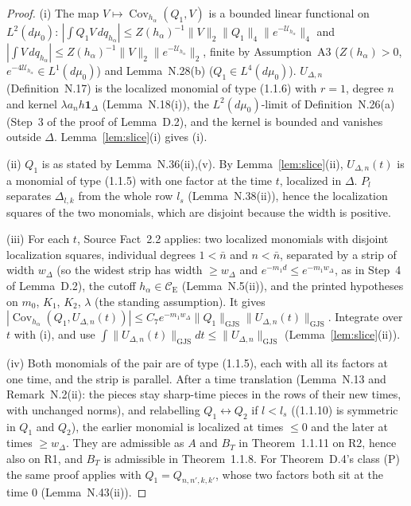 \documentclass[11pt,a4paper]{article}
\newcommand{\CE}{\mathcal{C}_{\mathrm E}}
\DeclareMathOperator{\Cov}{Cov}
\newcommand{\GJS}[1]{\lVert #1\rVert_{\mathrm{GJS}}}
\newcommand{\Uc}{\mathcal U}
\newcommand{\dmu}{d\mu_0}
\theoremstyle{plain}
\theoremstyle{definition}
\begin{document}
\begin{proof}
(i) The map $V\mapsto\Cov_{h_\alpha}(Q_1,V)$ is a bounded linear functional on $L^2(\dmu)$:
$|\int Q_1V\,dq_{h_\alpha}|\le Z(h_\alpha)^{-1}\|V\|_2\|Q_1\|_4\|e^{-\Uc_{h_\alpha}}\|_4$ and
$|\int V\,dq_{h_\alpha}|\le Z(h_\alpha)^{-1}\|V\|_2\|e^{-\Uc_{h_\alpha}}\|_2$, finite by
Assumption~A3 ($Z(h_\alpha)>0$, $e^{-4\Uc_{h_\alpha}}\in L^1(\dmu)$) and Lemma~N.28(b)
($Q_1\in L^4(\dmu)$).  $U_{\Delta,n}$ (Definition~N.17) is the localized monomial of type (1.1.6)
with $r=1$, degree $n$ and kernel $\lambda a_nh\mathbf 1_\Delta$ (Lemma~N.18(i)), the
$L^2(\dmu)$-limit of Definition~N.26(a) (Step~3 of the proof of Lemma~D.2), and the kernel is
bounded and vanishes outside $\Delta$.  Lemma~\ref{lem:slice}(i) gives (i).

(ii) $Q_1$ is as stated by Lemma~N.36(ii),(v).  By Lemma~\ref{lem:slice}(ii), $U_{\Delta,n}(t)$ is
a monomial of type (1.1.5) with one factor at the time $t$, localized in $\Delta$.  $P_l$
separates $\Delta_{l,k}$ from the whole row $l_s$ (Lemma~N.38(ii)), hence the localization
squares of the two monomials, which are disjoint because the width is positive.

(iii) For each $t$, Source Fact~2.2 applies: two localized monomials with disjoint localization
squares, individual degrees $1<\bar n$ and $n<\bar n$, separated by a strip of width $w_\Delta$
(so the widest strip has width $\ge w_\Delta$ and $e^{-m_1d}\le e^{-m_1w_\Delta}$, as in Step~4 of
Lemma~D.2), the cutoff $h_\alpha\in\CE$ (Lemma~N.5(ii)), and the printed hypotheses on $m_0$,
$K_1$, $K_2$, $\lambda$ (the standing assumption).  It gives
$|\Cov_{h_\alpha}(Q_1,U_{\Delta,n}(t))|\le C_7e^{-m_1w_\Delta}\GJS{Q_1}\GJS{U_{\Delta,n}(t)}$.
Integrate over $t$ with (i), and use
$\int\GJS{U_{\Delta,n}(t)}dt\le\GJS{U_{\Delta,n}}$ (Lemma~\ref{lem:slice}(ii)).

(iv) Both monomials of the pair are of type (1.1.5), each with all its factors at one time, and
the strip is parallel.  After a time translation (Lemma~N.13 and Remark~N.2(ii): the pieces stay
sharp-time pieces in the rows of their new times, with unchanged norms), and relabelling
$Q_1\leftrightarrow Q_2$ if $l<l_s$ ((1.1.10) is symmetric in $Q_1$ and $Q_2$), the earlier
monomial is localized at times $\le0$ and the later at times $\ge w_\Delta$.  They are admissible
as $A$ and $B_T$ in Theorem~1.1.11 on R2, hence also on R1, and $B_T$ is admissible in
Theorem~1.1.8.  For
Theorem~D.4's class (P) the same proof applies with $Q_1=Q_{n,n',k,k'}$, whose two factors both
sit at the time $0$ (Lemma~N.43(ii)).
\end{proof}
\end{document}
